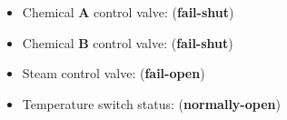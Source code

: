 





\begin{itemize}
\item{} Chemical {\bf A} control valve: ({\bf fail-shut})
\vskip 5pt
\item{} Chemical {\bf B} control valve: ({\bf fail-shut})
\vskip 5pt
\item{} Steam control valve: ({\bf fail-open})
\vskip 5pt
\item{} Temperature switch status: ({\bf normally-open})
\end{itemize}











